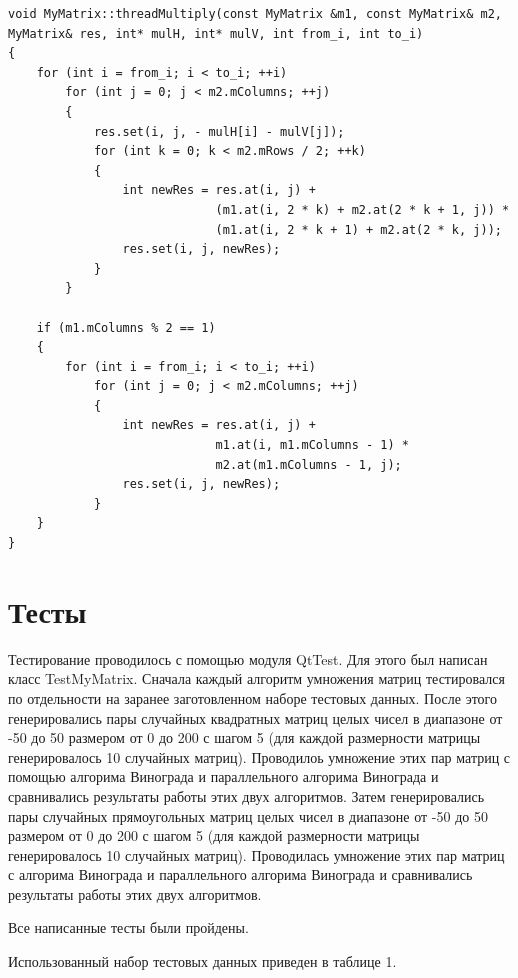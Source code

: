 \documentclass[a4paper,14pt]{report}
\begin{document}
\begin{lstlisting}[label=some-code,caption=\text{Метод threadMultiply, передаваемый каждому потоку}]
void MyMatrix::threadMultiply(const MyMatrix &m1, const MyMatrix& m2, MyMatrix& res, int* mulH, int* mulV, int from_i, int to_i)
{
    for (int i = from_i; i < to_i; ++i)
        for (int j = 0; j < m2.mColumns; ++j)
        {
            res.set(i, j, - mulH[i] - mulV[j]);
            for (int k = 0; k < m2.mRows / 2; ++k)
            {
                int newRes = res.at(i, j) +
                             (m1.at(i, 2 * k) + m2.at(2 * k + 1, j)) *
                             (m1.at(i, 2 * k + 1) + m2.at(2 * k, j));
                res.set(i, j, newRes);
            }
        }

    if (m1.mColumns % 2 == 1)
    {
        for (int i = from_i; i < to_i; ++i)
            for (int j = 0; j < m2.mColumns; ++j)
            {
                int newRes = res.at(i, j) +
                             m1.at(i, m1.mColumns - 1) *
                             m2.at(m1.mColumns - 1, j);
                res.set(i, j, newRes);
            }
    }
}
\end{lstlisting}


\section*{Тесты}

Тестирование проводилось с помощью модуля QtTest. Для этого был написан класс TestMyMatrix. Сначала каждый алгоритм умножения матриц тестировался по отдельности на заранее заготовленном наборе тестовых данных.
После этого генерировались пары случайных квадратных матриц целых чисел в диапазоне от -50 до 50 размером от 0 до 200 с шагом 5 (для каждой размерности матрицы генерировалось 10 случайных матриц). Проводилоь умножение этих пар матриц с помощью алгорима Винограда и параллельного алгорима Винограда и сравнивались результаты работы этих двух алгоритмов. Затем генерировались пары случайных прямоугольных матриц целых чисел в диапазоне от -50 до 50 размером от 0 до 200 с шагом 5 (для каждой размерности матрицы генерировалось 10 случайных матриц). Проводилась умножение этих пар матриц с алгорима Винограда и параллельного алгорима Винограда и сравнивались результаты работы этих двух алгоритмов.

Все написанные тесты были пройдены.

Использованный набор тестовых данных приведен в таблице 1.
\end{document}
